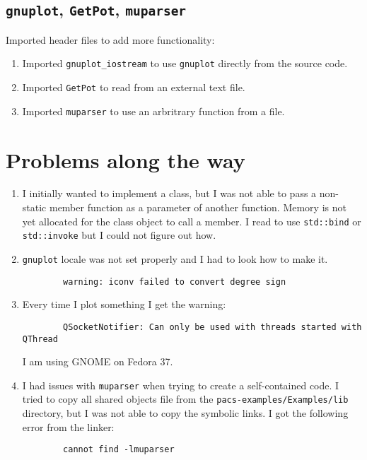 \documentclass[]{article}
\begin{document}
\subsection{\texttt{gnuplot}, \texttt{GetPot}, \texttt{muparser}}

Imported header files to add more functionality:
\begin{enumerate}
	\item  Imported \texttt{gnuplot\_iostream} to use \texttt{gnuplot} directly from the source code. 
	\item Imported \texttt{GetPot} to read from an external text  file. 
	\item Imported \texttt{muparser} to use an arbritrary function from a file. 
\end{enumerate}


\section{Problems along the way}

\begin{enumerate}
	\item I initially wanted to implement a class, but I was not able to pass a non-static member function as a parameter of another function.
	Memory is not yet allocated for the class object to call a member. I read to use \texttt{std::bind} or \texttt{std::invoke} but I could not figure out how.
	\item \texttt{gnuplot} locale was not set properly and I had to look how to make it.
	\begin{verbatim}
		warning: iconv failed to convert degree sign
	\end{verbatim}
	\item  Every time I plot something I get the warning:
	{
	\small
	\begin{verbatim}
		QSocketNotifier: Can only be used with threads started with QThread
	\end{verbatim}
	}
	I am using GNOME on Fedora 37.
	\item I had issues with \texttt{muparser} when trying to create a self-contained code.
	I tried to copy all shared objects file from the \texttt{pacs-examples/Examples/lib} directory, but I was not able to copy the symbolic links.
	I got the following error from the linker:
	\begin{verbatim}
		cannot find -lmuparser
	\end{verbatim}
\end{enumerate}
\end{document}
